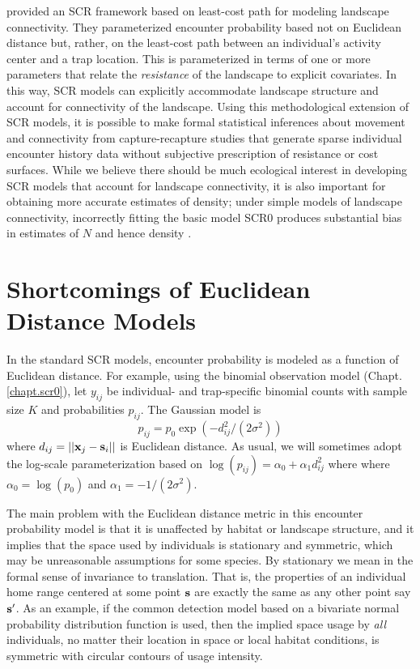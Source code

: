 \citet{royle_etal:2012ecol} provided an SCR
framework based on least-cost path for modeling landscape
connectivity. They parameterized encounter probability
based not on Euclidean distance but, rather,
on the least-cost path between an individual's activity center and a
trap location. This is parameterized in terms of one or more
parameters that relate the {\it resistance} of the landscape to
explicit covariates.  In this way, SCR models can explicitly accommodate
landscape structure and account for connectivity of the landscape.
Using this
methodological extension of SCR models, it is possible to make formal
statistical inferences about movement and connectivity from
capture-recapture studies that generate sparse individual encounter
history data without subjective prescription of resistance or cost
surfaces. %
While we believe there
should be much ecological interest in developing SCR models that
account for landscape connectivity, it is also important for obtaining
more accurate estimates of density; under simple models of landscape
connectivity, incorrectly fitting the basic model SCR0 produces
substantial bias in estimates of $N$ and hence density  \citep{royle_etal:2012ecol}.


\section{Shortcomings of Euclidean Distance Models}

In the standard SCR models, encounter probability is modeled as a
function of Euclidean distance. For example, using the binomial
observation model (Chapt. \ref{chapt.scr0}), let $y_{ij}$ be
individual- and trap-specific binomial counts with sample size $K$ and
probabilities $p_{ij}$. The Gaussian model is
\[
p_{ij} = p_{0} \exp(-  d_{ij}^2 /(2\sigma^{2}) )
\]
where $d_{ij} = ||{\bf x}_{j} - {\bf s}_{i}||$ is Euclidean
distance. As usual, we will sometimes adopt the log-scale
parameterization based on $\log(p_{ij})= \alpha_{0} + \alpha_{1}
d_{ij}^{2}$ where where $\alpha_{0} = \log(p_{0})$ and $\alpha_{1} =
-1/(2\sigma^2)$.

The main problem with the Euclidean distance metric in this encounter
probability model is that it is unaffected by habitat or landscape
structure, and it implies that the space used by individuals is
stationary and symmetric, which may be unreasonable assumptions for
some species. By stationary %
we mean in the formal sense of
invariance to translation. That is, the properties of an individual
home range centered at some point ${\bf s}$ are exactly the same as
any other point say ${\bf s}'$.  As an example, if the common
detection model based on a bivariate normal probability distribution
function is used, then the implied space usage by {\it all}
individuals, no matter their location in space or local habitat
conditions, is symmetric with circular contours of usage intensity.

